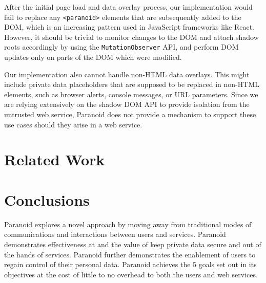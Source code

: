 \documentclass[letterpaper,twocolumn,10pt]{article}
\begin{document}
After the initial page load and data overlay process, our implementation would fail to replace any \texttt{<paranoid>} elements that are subsequently added to the DOM, which is an increasing pattern used in JavaScript frameworks like React. However, it should be trivial to monitor changes to the DOM and attach shadow roots accordingly by using the \texttt{MutationObserver} API, and perform DOM updates only on parts of the DOM which were modified.

Our implementation also cannot handle non-HTML data overlays. This might include private data placeholders that are supposed to be replaced in non-HTML elements, such as browser alerts, console messages, or URL parameters. Since we are relying extensively on the shadow DOM API to provide isolation from the untrusted web service, Paranoid does not provide a mechanism to support these use cases should they arise in a web service.

\section{Related Work}


\section{Conclusions}

Paranoid explores a novel approach by moving away from traditional modes of communications and interactions between users and services. Paranoid demonstrates effectiveness at and the value of keep private data secure and out of the hands of services. Paranoid further demonstrates the enablement of users to regain control of their personal data. Paranoid achieves the 5 goals set out in its objectives at the cost of little to no overhead to both the users and web services.





\end{document}
